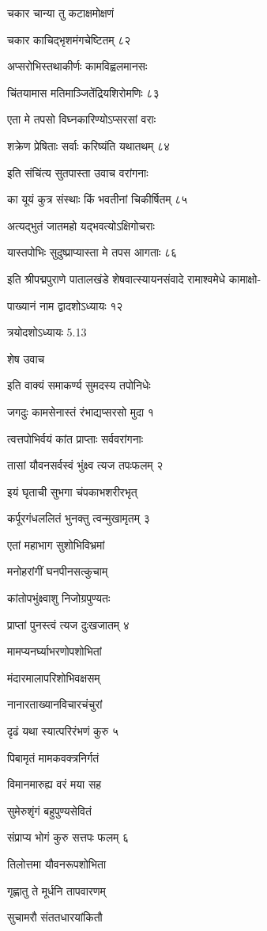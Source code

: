 चकार चान्या तु कटाक्षमोक्षणं

चकार काचिद्भृशमंगचेष्टितम् ८२

अप्सरोभिस्तथाकीर्णः कामविह्वलमानसः

चिंतयामास मतिमाञ्जितेंद्रियशिरोमणिः ८३

एता मे तपसो विघ्नकारिण्योऽप्सरसां वराः

शक्रेण प्रेषिताः सर्वाः करिष्यंति यथातथम् ८४

इति संचिंत्य सुतपास्ता उवाच वरांगनाः

का यूयं कुत्र संस्थाः किं भवतीनां चिकीर्षितम् ८५

अत्यद्भुतं जातमहो यद्भवत्योऽक्षिगोचराः

यास्तपोभिः सुदुष्प्राप्यास्ता मे तपस आगताः ८६

इति श्रीपद्मपुराणे पातालखंडे शेषवात्स्यायनसंवादे रामाश्वमेधे कामाक्षो-

पाख्यानं नाम द्वादशोऽध्यायः १२

त्रयोदशोऽध्यायः 5.13

शेष उवाच

इति वाक्यं समाकर्ण्य सुमदस्य तपोनिधेः

जगदुः कामसेनास्तं रंभाद्यप्सरसो मुदा १

त्वत्तपोभिर्वयं कांत प्राप्ताः सर्ववरांगनाः

तासां यौवनसर्वस्वं भुंक्ष्व त्यज तपःफलम् २

इयं घृताची सुभगा चंपकाभशरीरभृत्

कर्पूरगंधललितं भुनक्तु त्वन्मुखामृतम् ३

एतां महाभाग सुशोभिविभ्रमां

मनोहरांगीं घनपीनसत्कुचाम्

कांतोपभुंक्ष्वाशु निजोग्रपुण्यतः

प्राप्तां पुनस्त्वं त्यज दुःखजातम् ४

मामप्यनर्घ्याभरणोपशोभितां

मंदारमालापरिशोभिवक्षसम्

नानारताख्यानविचारचंचुरां

दृढं यथा स्यात्परिरंभणं कुरु ५

पिबामृतं मामकवक्त्रनिर्गतं

विमानमारुह्य वरं मया सह

सुमेरुशृंगं बहुपुण्यसेवितं

संप्राप्य भोगं कुरु सत्तपः फलम् ६

तिलोत्तमा यौवनरूपशोभिता

गृह्णातु ते मूर्धनि तापवारणम्

सुचामरौ संततधारयांकितौ

